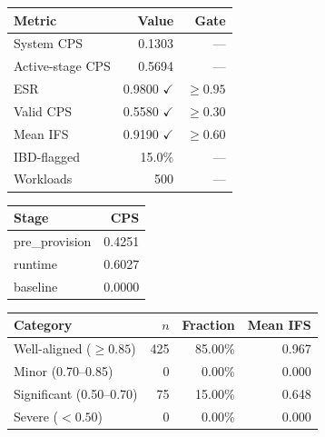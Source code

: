 \begin{tabular}{lrr}
\toprule
\textbf{Metric} & \textbf{Value} & \textbf{Gate} \\
\midrule

System CPS & 0.1303 & --- \\
Active-stage CPS & 0.5694 & --- \\
ESR & 0.9800 $\checkmark$ & $\geq 0.95$ \\
Valid CPS & 0.5580 $\checkmark$ & $\geq 0.30$ \\
Mean IFS & 0.9190 $\checkmark$ & $\geq 0.60$ \\
IBD-flagged & 15.0\% & --- \\
Workloads & 500 & --- \\
\bottomrule
\end{tabular}


\begin{tabular}{lr}
\toprule
\textbf{Stage} & \textbf{CPS} \\
\midrule

pre\_provision & 0.4251 \\
runtime & 0.6027 \\
baseline & 0.0000 \\
\bottomrule
\end{tabular}


\begin{tabular}{lrrr}
\toprule
\textbf{Category} & \textbf{$n$} & \textbf{Fraction} & \textbf{Mean IFS} \\
\midrule

Well-aligned ($\geq 0.85$) & 425 & 85.00\% & 0.967 \\
Minor (0.70--0.85) & 0 & 0.00\% & 0.000 \\
Significant (0.50--0.70) & 75 & 15.00\% & 0.648 \\
Severe ($< 0.50$) & 0 & 0.00\% & 0.000 \\
\bottomrule
\end{tabular}
